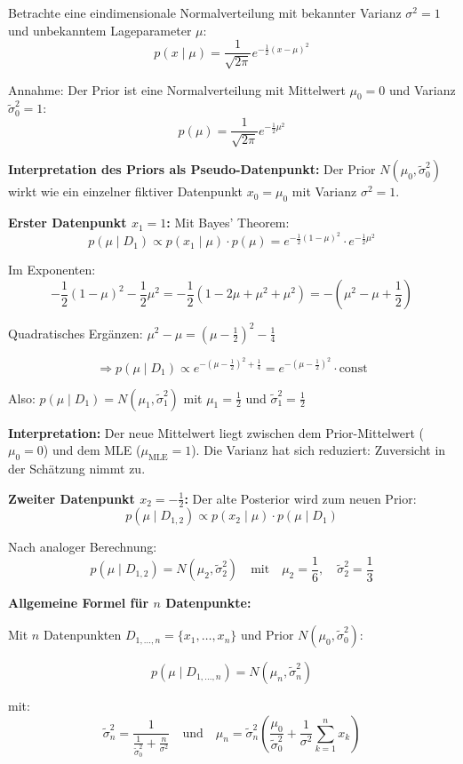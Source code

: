 Betrachte eine eindimensionale Normalverteilung mit bekannter Varianz $\sigma^2 = 1$ und unbekanntem Lageparameter $\mu$:
$$p(x \mid \mu) = \frac{1}{\sqrt{2\pi}} e^{-\frac{1}{2}(x-\mu)^2}$$

Annahme: Der Prior ist eine Normalverteilung mit Mittelwert $\mu_0 = 0$ und Varianz $\tilde{\sigma}_0^2 = 1$:
$$p(\mu) = \frac{1}{\sqrt{2\pi}} e^{-\frac{1}{2}\mu^2}$$

\textbf{Interpretation des Priors als Pseudo-Datenpunkt:} Der Prior $N(\mu_0, \tilde{\sigma}_0^2)$ wirkt wie ein einzelner fiktiver Datenpunkt $x_0 = \mu_0$ mit Varianz $\sigma^2 = 1$.

\textbf{Erster Datenpunkt $x_1 = 1$:} Mit Bayes' Theorem:
$$p(\mu \mid D_1) \propto p(x_1 \mid \mu) \cdot p(\mu) = e^{-\frac{1}{2}(1-\mu)^2} \cdot e^{-\frac{1}{2}\mu^2}$$

Im Exponenten:
$$-\frac{1}{2}(1-\mu)^2 - \frac{1}{2}\mu^2 = -\frac{1}{2}(1 - 2\mu + \mu^2 + \mu^2) = -(\mu^2 - \mu + \frac{1}{2})$$

Quadratisches Ergänzen: $\mu^2 - \mu = (\mu - \frac{1}{2})^2 - \frac{1}{4}$

$$\Rightarrow p(\mu \mid D_1) \propto e^{-(\mu - \frac{1}{2})^2 + \frac{1}{4}} = e^{-(\mu - \frac{1}{2})^2} \cdot \text{const}$$

Also: $p(\mu \mid D_1) = N(\mu_1, \tilde{\sigma}_1^2)$ mit $\mu_1 = \frac{1}{2}$ und $\tilde{\sigma}_1^2 = \frac{1}{2}$

\textbf{Interpretation:} Der neue Mittelwert liegt zwischen dem Prior-Mittelwert ($\mu_0 = 0$) und dem MLE ($\mu_{\text{MLE}} = 1$). Die Varianz hat sich reduziert: Zuversicht in der Schätzung nimmt zu.

\textbf{Zweiter Datenpunkt $x_2 = -\frac{1}{2}$:} Der alte Posterior wird zum neuen Prior:
$$p(\mu \mid D_{1,2}) \propto p(x_2 \mid \mu) \cdot p(\mu \mid D_1)$$

Nach analoger Berechnung:
$$p(\mu \mid D_{1,2}) = N(\mu_2, \tilde{\sigma}_2^2) \quad \text{mit} \quad \mu_2 = \frac{1}{6}, \quad \tilde{\sigma}_2^2 = \frac{1}{3}$$

\textbf{Allgemeine Formel für $n$ Datenpunkte:}

Mit $n$ Datenpunkten $D_{1,\ldots,n} = \{x_1, \ldots, x_n\}$ und Prior $N(\mu_0, \tilde{\sigma}_0^2)$:

$$p(\mu \mid D_{1,\ldots,n}) = N(\mu_n, \tilde{\sigma}_n^2)$$

mit:
$$\tilde{\sigma}_n^2 = \frac{1}{\frac{1}{\tilde{\sigma}_0^2} + \frac{n}{\sigma^2}} \quad \text{und} \quad \mu_n = \tilde{\sigma}_n^2 \left( \frac{\mu_0}{\tilde{\sigma}_0^2} + \frac{1}{\sigma^2}\sum_{k=1}^{n} x_k \right)$$

